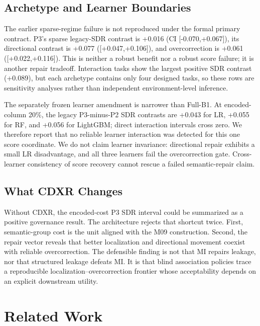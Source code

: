 \documentclass[sigconf,review]{acmart}
\begin{document}


\subsection{Archetype and Learner Boundaries}

The earlier sparse-regime failure is not reproduced under the formal primary
contract. P3's sparse legacy-SDR contrast is +0.016 (CI [-0.070,+0.067]), its
directional contrast is +0.077 ([+0.047,+0.106]), and overcorrection is +0.061
([+0.022,+0.116]). This is neither a robust benefit nor a robust score failure;
it is another repair tradeoff. Interaction tasks show the largest positive SDR
contrast (+0.089), but each archetype contains only four designed tasks, so
these rows are sensitivity analyses rather than independent environment-level
inference.

The separately frozen learner amendment is narrower than Full-B1. At
encoded-column 20\%, the legacy P3-minus-P2 SDR contrasts are +0.043 for LR,
+0.055 for RF, and +0.056 for LightGBM; direct interaction intervals cross
zero. We therefore report that no reliable learner interaction was detected
for this one score coordinate. We do not claim learner invariance: directional
repair exhibits a small LR disadvantage, and all three learners fail the
overcorrection gate. Cross-learner consistency of score recovery cannot rescue
a failed semantic-repair claim.

\subsection{What CDXR Changes}

Without CDXR, the encoded-cost P3 SDR interval could be summarized as a
positive governance result. The architecture rejects that shortcut twice.
First, semantic-group cost is the unit aligned with the M09 construction.
Second, the repair vector reveals that better localization and directional
movement coexist with reliable overcorrection. The defensible finding is not
that MI repairs leakage, nor that structured leakage defeats MI. It is that
blind association policies trace a reproducible localization--overcorrection
frontier whose acceptability depends on an explicit downstream utility.

\section{Related Work}
\end{document}
